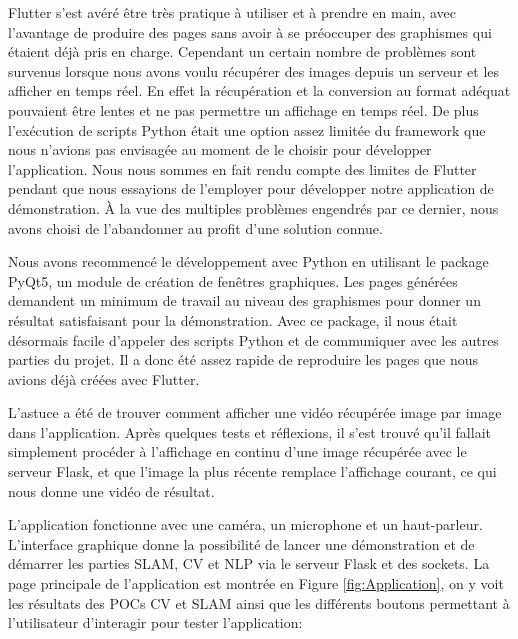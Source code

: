 \documentclass[11pt]{article}
\begin{document}
        Flutter s'est avéré être très pratique à utiliser et à prendre en main, avec l'avantage de produire des pages sans avoir à se préoccuper 
        des graphismes qui étaient déjà pris en charge. Cependant un certain nombre de problèmes sont survenus lorsque nous avons voulu récupérer 
        des images depuis un serveur et les afficher en temps réel. En effet la récupération et la conversion au format adéquat pouvaient être lentes
        et ne pas permettre un affichage en temps réel. De plus l'exécution de scripts Python était une option assez limitée du framework que nous 
        n'avions pas envisagée au moment de le choisir pour développer l'application. Nous nous sommes en fait rendu compte des limites de Flutter 
        pendant que nous essayions de l'employer pour développer notre application de démonstration. À la vue des multiples problèmes engendrés par 
        ce dernier, nous avons choisi de l'abandonner au profit d'une solution connue.

        Nous avons recommencé le développement avec Python en utilisant le package PyQt5, un module de création de fenêtres graphiques. Les pages 
        générées demandent un minimum de travail au niveau des graphismes pour donner un résultat satisfaisant pour la démonstration. Avec ce package, 
        il nous était désormais facile d'appeler des scripts Python et de communiquer avec les autres parties du projet. Il a donc été assez rapide 
        de reproduire les pages que nous avions déjà créées avec Flutter.      
        
        L'astuce a été de trouver comment afficher une vidéo récupérée image par image dans l'application. Après quelques tests et réflexions, 
        il s'est trouvé qu'il fallait simplement procéder à l'affichage en continu d'une image récupérée avec le serveur Flask, et que 
        l'image la plus récente remplace l'affichage courant, ce qui nous donne une vidéo de résultat.

        \pagebreak

        L'application fonctionne avec une caméra, un microphone et un haut-parleur.
        L'interface graphique donne la possibilité de lancer une démonstration et de démarrer les parties SLAM, CV et NLP via le serveur Flask 
        et des sockets. La page principale de l'application est
        montrée en Figure \ref{fig:Application}, on y voit les résultats des POCs CV et SLAM ainsi que les différents boutons permettant
        à l'utilisateur d'interagir pour tester l'application:
\end{document}

